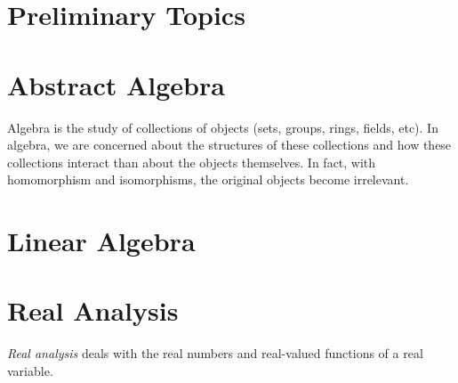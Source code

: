 \documentclass[11pt,a4paper,oneside]{book}
\newif\ifprelim
\newif\iflinalg
\newif\ifabsalg
\newif\ifanalysis
\newif\iftop
\newif\ifapplied
\begin{document}
\prelimtrue %
\absalgtrue %
\linalgtrue %
\analysistrue %
\toptrue %



\mainmatter
\ifprelim
    \part{Preliminary Topics}\label{part:prelim}
    
    
\fi

\ifabsalg
    \part{Abstract Algebra}\label{part:abstract-algebra}
    Algebra is the study of collections of objects (sets, groups, rings, fields, etc). In algebra, we are concerned about the structures of these collections and how these collections interact than about the objects themselves. In fact, with homomorphism and isomorphisms, the original objects become irrelevant.
    
%    
%    
%    
\fi

\iflinalg
    \part{Linear Algebra}\label{part:linear-algebra}
    
    
%    
%    
%    
\fi

\ifanalysis
    \part{Real Analysis}\label{part:real-analysis}
    \emph{Real analysis} deals with the real numbers and real-valued functions of a real variable.
\end{document}
